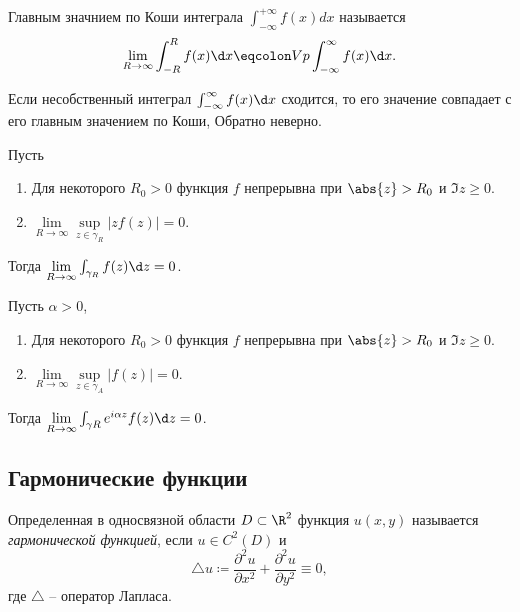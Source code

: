 \begin{definition}
	Главным значнием по Коши интеграла $\int_{-\infty }^{+\infty } f(x)dx$ называется
	\[
		\underset{R \rightarrow \infty }{\lim} \int_{-R}^{R} f(x)\d x \eqcolon Vp \int_{-\infty }^{\infty } f(x)\d x.
	\]
\end{definition}

\begin{remark}
	Если несобственный интеграл $\int_{-\infty }^{\infty } f(x)\d x$ сходится, то его значение совпадает с его главным значением по Коши, Обратно неверно.
\end{remark}

\begin{lemma}
	Пусть
	\begin{enumerate}
		\item Для некоторого $R_0 > 0$ функция $f$ непрерывна при $\abs{z} > R_0$ и $\Im z \geqslant 0$.
		\item $\underset{R \rightarrow \infty }{\lim} \underset{z \in \gamma _R}{\sup} \big|zf(z)\big| = 0$.
	\end{enumerate}

	Тогда $\underset{R \rightarrow \infty }{\lim} \int_{\gamma_R } f(z)\d z = 0$.
\end{lemma}

\begin{lemma}[Жордана]
	Пусть $\alpha >0$,
	\begin{enumerate}
		\item Для некоторого $R_0 > 0$ функция $f$ непрерывна при $\abs{z} > R_0$ и $\Im z \geqslant 0$.
		\item $\underset{R \rightarrow \infty }{\lim} \underset{z \in \gamma _A}{\sup} \big|f(z)\big| = 0$.
	\end{enumerate}

	Тогда $\underset{R \rightarrow \infty }{\lim} \int_{\gamma R} e^{i \alpha z} f(z)\d z = 0$.
\end{lemma}

\newpage

\subsection{Гармонические функции}

\begin{definition}
	Определенная в односвязной области $D \subset \R^2$ функция $u(x,y)$ называется \emph{гармонической функцией}, если $u \in C^2(D)$ и
	\[
		\triangle u \coloneq \frac{\partial^2 u}{\partial x^2} + \frac{\partial^2 u}{\partial y^2} \equiv 0,
	\]
	где $\triangle$ -- оператор Лапласа.
\end{definition}

